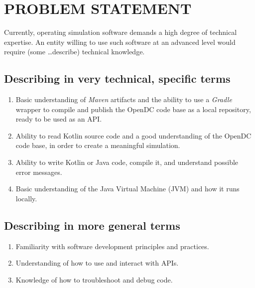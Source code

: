 \section{PROBLEM STATEMENT}

Currently, operating simulation software demands a high degree of technical expertise.
An entity willing to use such software at an advanced level would require (some \ldots describe) technical knowledge.

\subsection{Describing in very technical, specific terms}

\begin{enumerate}
    \item Basic understanding of \textit{Maven} artifacts and the ability to use a \textit{Gradle} wrapper to compile and publish the OpenDC code base as a local repository, ready to be used as an API.
    \item Ability to read Kotlin source code and a good understanding of the OpenDC code base, in order to create a meaningful simulation.
    \item Ability to write Kotlin or Java code, compile it, and understand possible error messages.
    \item Basic understanding of the Java Virtual Machine (JVM) and how it runs locally.
\end{enumerate}

\subsection{Describing in more general terms}

\begin{enumerate}
    \item Familiarity with software development principles and practices.
    \item Understanding of how to use and interact with APIs.
    \item Knowledge of how to troubleshoot and debug code.
\end{enumerate}